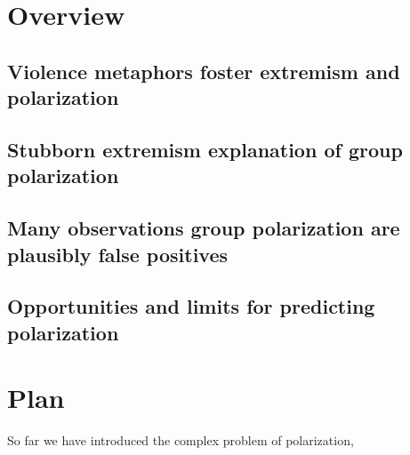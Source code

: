 \documentclass[12pt,letterpaper]{article}
\begin{document}
\section{Overview}

\subsection{Violence metaphors foster extremism and polarization}

\subsection{Stubborn extremism explanation of group polarization}

\subsection{Many observations group polarization are plausibly false positives}

\subsection{Opportunities and limits for predicting polarization}

\section{Plan}

So far we have introduced the complex problem of polarization, 



\setlength{\bibleftmargin}{.125in}
\setlength{\bibindent}{-\bibleftmargin}


\end{document}
